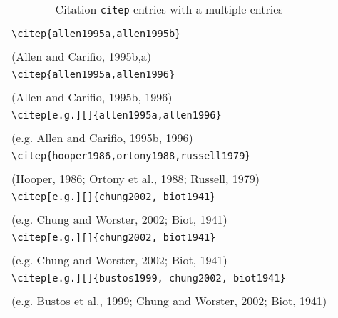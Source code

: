 \documentclass{article}
\begin{document}
\begin{table}
\begin{center}
\begin{tabular}{l}
    \verb#\citep{allen1995a,allen1995b}# \\
    \citep{allen1995a,allen1995b} \\
    (Allen and Carifio, 1995b,a) \\
\hline
    \verb#\citep{allen1995a,allen1996}# \\
    \citep{allen1995a,allen1996} \\
    (Allen and Carifio, 1995b, 1996) \\
\hline
    \verb#\citep[e.g.][]{allen1995a,allen1996}# \\
    \citep[e.g.][]{allen1995a,allen1996} \\
    (e.g. Allen and Carifio, 1995b, 1996) \\
\hline
    \verb#\citep{hooper1986,ortony1988,russell1979}# \\
    \citep{hooper1986,ortony1988,russell1979}  \\
    (Hooper, 1986; Ortony et al., 1988; Russell, 1979)\\
 \hline
    \verb#\citep[e.g.][]{chung2002, biot1941}#\\
    \citep[e.g.][]{chung2002, biot1941} \\
    (e.g. Chung and Worster, 2002; Biot, 1941)\\
 \hline
    \verb#\citep[e.g.][]{chung2002, biot1941}#\\
    \citep[e.g.][]{chung2002, biot1941} \\
    (e.g. Chung and Worster, 2002; Biot, 1941)\\
 \hline
    \verb#\citep[e.g.][]{bustos1999, chung2002, biot1941}#\\
    \citep[e.g.][]{bustos1999, chung2002, biot1941} \\
    (e.g. Bustos et al., 1999; Chung and Worster, 2002; Biot, 1941)\\
\end{tabular}
\end{center}
\caption{Citation \texttt{citep} entries with a multiple entries}
\end{table}
\end{document}
